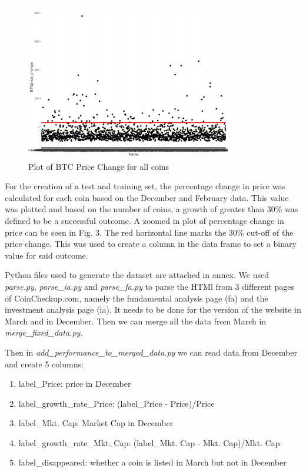 \documentclass[11pt, english, letterpaper]{article}
\begin{document}
\begin{figure}[!h]
    \centering
    \includegraphics[width=0.8\textwidth]{data_ICO.png}
    \caption{Plot of BTC Price Change for all coins}
\end{figure}

For the creation of a test and training set, the percentage change in price was calculated for each coin based on the December and February data. This value was plotted and based on the number of coins, a growth of greater than 30\% was defined to be a successful outcome. A zoomed in plot of percentage change in price can be seen in Fig. 3. The red horizontal line marks the 30\% cut-off of the price change. This was used to create a column in the data frame to set a binary value for said outcome. 

Python files used to generate the dataset are attached in annex. We used \emph{parse.py}, \emph{parse\_ia.py} and \emph{parse\_fa.py} to parse the HTMl from 3 different pages of CoinCheckup.com, namely the fundamental analysis page (fa) and the investment analysis page (ia). It needs to be done for the version of the website in March and in December. Then we can merge all the data from March in \emph{merge\_fixed\_data.py}.

Then in \emph{add\_performance\_to\_merged\_data.py} we can read data from December and create 5 columns:
\begin{enumerate}
    \item label\_Price: price in December
    \item label\_growth\_rate\_Price: (label\_Price - Price)/Price
    \item label\_Mkt. Cap: Market Cap in December
    \item label\_growth\_rate\_Mkt. Cap: (label\_Mkt. Cap - Mkt. Cap)/Mkt. Cap
    \item label\_disappeared: whether a coin is listed in March but not in December
\end{enumerate}
\end{document}
